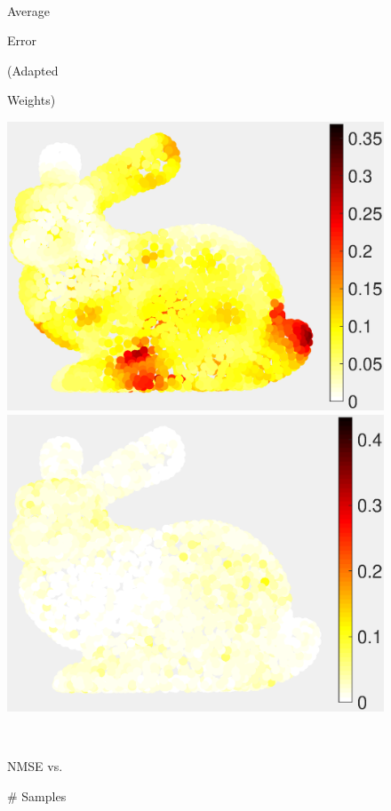 \documentclass[journal, 10pt]{IEEEtran}
\begin{document}
\begin{figure}[H]
\begin{minipage}[m]{0.4\linewidth}
\end{minipage} \\
\begin{minipage}[m]{0.16\linewidth}
\centerline{\small{Average}}
\centerline{\small{Error}}
\centerline{\small{(Adapted}}
\centerline{\small{Weights)}}
\end{minipage}
\begin{minipage}[m]{0.4\linewidth}
\centerline{\includegraphics[width=.85\linewidth]{fig_rec_low_error_adapted}}
\end{minipage}
\begin{minipage}[m]{0.4\linewidth}
\centerline{\includegraphics[width=.85\linewidth]{fig_rec_band_error_adapted}}
\end{minipage} \\
\begin{minipage}[m]{0.16\linewidth}
\centerline{\small{NMSE vs.}}
\centerline{\small{\# Samples}}

\end{minipage}
\end{figure}
\end{document}
